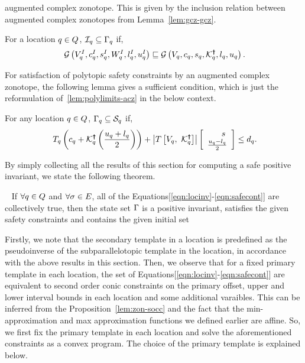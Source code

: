 augmented complex zonotope.  This is given by the inclusion relation
between augmented complex zonotopes from Lemma~\ref{lem:gcz-gcz}.
\begin{lemma}
 For a location $q \in Q$, $\mathcal{I}_q\subseteq
  \Gamma_q$ if,
\begin{align}~\label{eqn:initcont}
\mathcal{G}\left(V^I_q,c^I_q,s^I_q,W^I_q,l^I_q,u^I_q\right)\sqsubseteq\mathcal{G}\left(V_q,c_q,s_q,\mathcal{K}^{\bm{\dagger}}_q,l_q,u_q\right).
\end{align}
\end{lemma}
%
For satisfaction of polytopic safety constraints by an augmented
complex zonotope, the following lemma gives a sufficient condition,
which is just the reformulation of~\ref{lem:polylimits-acz} in
the below context.
%
\begin{lemma}
For any location $q\in Q$,
  $\Gamma_q\subseteq \mathcal{S}_q$ if,
\begin{align}~\label{eqn:safecont}
T_q\left(c_q+\mathcal{K}^{\bm{\dagger}}_q\left(\frac{u_q+l_q}{2}\right)\right)+\left|T\left[V_q,~\mathcal{K}^{\bm{\dagger}}_q\right]\right|\left[\begin{array}{c}{\hspace{1.5em}s}\\{\frac{u_q-l_q}{2}} \end{array}\right]\leq d_q.
\end{align}
\end{lemma}
%
By simply collecting all the results of this section for computing a safe
positive invariant, we state the following theorem.
%
\begin{theorem}~\label{thm:main} If
  $\forall q\in Q$ and $\forall \sigma\in E$, all of
  the Equations[\ref{eqn:locinv}-\ref{eqn:safecont}] are collectively
  true, then the state set $\Gamma$ is a positive invariant,
  satisfies the given safety constraints and contains the given
  initial set
\end{theorem}

  Firstly, we note that the secondary
template in a location is predefined as the pseudoinverse of the
subparallelotopic template in the location, in accordance with the
above results in this section.  Then, we observe that for a fixed
primary template in each location, the set of
Equations[\ref{eqn:locinv}-\ref{eqn:safecont}] are equivalent to
second order conic constraints on the primary offset, upper and lower
interval bounds in each location and some additional varaibles.  This
can be inferred from the Proposition~\ref{lem:zon-socc} and the fact
that the min-approximation and max approximation functions we defined
earlier are affine. So, we first fix the primary template in each
location and solve the aforementioned constraints as a convex program.
The choice of the primary template is explained below.

